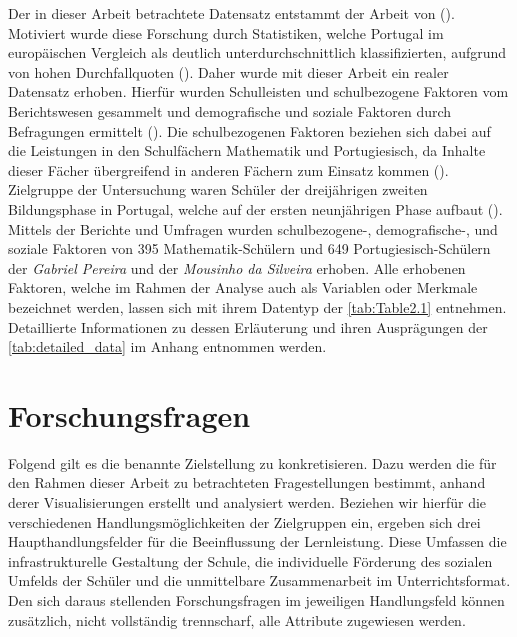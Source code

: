 Der in dieser Arbeit betrachtete Datensatz entstammt der Arbeit von (\cite[]{Cortez2008UsingDM}).
Motiviert wurde diese Forschung durch Statistiken, welche Portugal im europäischen Vergleich als deutlich unterdurchschnittlich klassifizierten, aufgrund von hohen Durchfallquoten (\cite[S. 1]{Cortez2008UsingDM}).
Daher wurde mit dieser Arbeit ein realer Datensatz erhoben.
Hierfür wurden Schulleisten und schulbezogene Faktoren vom Berichtswesen gesammelt und demografische und soziale Faktoren durch Befragungen ermittelt (\cite[S. 1]{Cortez2008UsingDM}).
Die schulbezogenen Faktoren beziehen sich dabei auf die Leistungen in den Schulfächern Mathematik und Portugiesisch, da Inhalte dieser Fächer übergreifend in anderen Fächern zum Einsatz kommen (\cite[S. 2]{Cortez2008UsingDM}).
Zielgruppe der Untersuchung waren Schüler der dreijährigen zweiten Bildungsphase in Portugal, welche auf der ersten neunjährigen Phase aufbaut (\cite[S. 2]{Cortez2008UsingDM}).
Mittels der Berichte und Umfragen wurden schulbezogene-, demografische-, und soziale Faktoren von 395 Mathematik-Schülern und 649 Portugiesisch-Schülern der \textit{Gabriel Pereira} und der \textit{Mousinho da Silveira} erhoben.
Alle erhobenen Faktoren, welche im Rahmen der Analyse auch als Variablen oder Merkmale bezeichnet werden, lassen sich mit ihrem Datentyp der \autoref{tab:Table2.1} entnehmen. 
Detaillierte Informationen zu dessen Erläuterung und ihren Ausprägungen der \autoref{tab:detailed_data} im Anhang entnommen werden.




\section[Forschungsfragen]{Forschungsfragen}

Folgend gilt es die benannte Zielstellung zu konkretisieren. 
Dazu werden die für den Rahmen dieser Arbeit zu betrachteten Fragestellungen bestimmt, anhand derer Visualisierungen erstellt und analysiert werden.
Beziehen wir hierfür die verschiedenen Handlungsmöglichkeiten der Zielgruppen ein, ergeben sich drei Haupthandlungsfelder für die Beeinflussung der Lernleistung.
Diese Umfassen die infrastrukturelle Gestaltung der Schule, die individuelle Förderung des sozialen Umfelds der Schüler und die unmittelbare Zusammenarbeit im Unterrichtsformat.
Den sich daraus stellenden Forschungsfragen im jeweiligen Handlungsfeld können zusätzlich, nicht vollständig trennscharf, alle Attribute zugewiesen werden.

